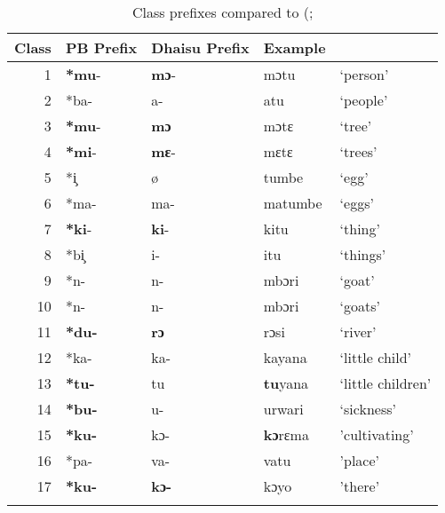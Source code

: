 \documentclass[output=paper,colorlinks,citecolor=brown]{langscibook}
\begin{document}
\begin{table}%
\caption{Class prefixes compared to (\citealt[97]{Meeussen1967}; \citealt[14]{RugemaliraEtAl2019}}
\label{tab:ngonyani:14}
    \begin{tabularx}{\textwidth}{r XXX l}
    \lsptoprule
        Class & PB Prefix & Dhaisu Prefix & Example\\
    \midrule
        1 & \textbf{*mu}-   & \textbf{mɔ}-  & mɔtu              & ‘person’\\
        2 & *ba-            & a-            & atu               & ‘people’\\
        3 & \textbf{*mu}-   & \textbf{mɔ }  & mɔtɛ              & ‘tree’\\
        4 & \textbf{*mi}-   & \textbf{mɛ}-  & mɛtɛ              & ‘trees’\\
        5 & *i̧              & ø             & tumbe             & ‘egg’\\
        6 & *ma-            & ma-           & matumbe           & ‘eggs’\\
        7 & \textbf{*ki}-   & \textbf{ki}-  & kitu              & ‘thing’\\
        8 & *bi̧             & i-            & itu               & ‘things’\\
        9 & *n-             & n-            & mbɔri             & ‘goat’\\
        10 & *n-            & n-            & mbɔri             & ‘goats’\\
        11 & \textbf{*du-}  & \textbf{rɔ}   & rɔsi              & ‘river’\\
        12 & *ka-           & ka-           & kayana            & ‘little child’\\
        13 & \textbf{*tu-}  & tu            & \textbf{tu}yana   & ‘little children’\\
        14 & \textbf{*bu-}  & u-            & urwari            & ‘sickness’\\
        15 & \textbf{*ku-}  & kɔ-           & \textbf{kɔ}rɛma   & 'cultivating'  \\
        16 & *pa-           & va-           & vatu              & 'place’\\
        17 & \textbf{*ku-}  & \textbf{kɔ-}  & kɔyo              & 'there' \\
    \lspbottomrule
    \end{tabularx}
\end{table}
\end{document}
